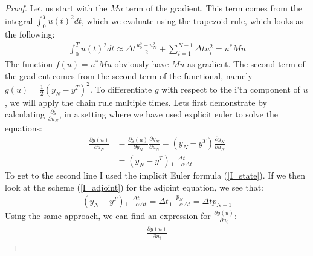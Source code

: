 \documentclass[11pt,a4paper]{article}
\begin{document}
\begin{proof}
Let us start with the $Mu$ term of the gradient. This term comes from the integral $\int_0^T u(t)^2dt$, which we evaluate using the trapezoid rule, which looks as the following:
\begin{align*}
\int_0^T u(t)^2dt \approx \Delta t\frac{u_0^2+u_N^2}{2} + \sum_{i=1}^{N-1} \Delta t u_i^2 = u^*Mu
\end{align*} 
The function $f(u)=u^*Mu$ obviously have $Mu$ as gradient. The second term of the gradient comes from the second term of the functional, namely $g(u)=\frac{1}{2}(y_N -y^T)^2$. To differentiate $g$ with respect to the i'th component of $u$, we will apply the chain rule multiple times. Lets first demonstrate by calculating $\frac{\partial g}{\partial u_N}$, in a setting where we have used explicit euler to solve the equations:
\begin{align*}
\frac{\partial g(u)}{\partial u_N} &= \frac{\partial g(u)}{\partial y_N}\frac{\partial y_N}{\partial u_N} = (y_N -y^T)\frac{\partial y_N}{\partial u_N}\\
&= (y_N -y^T)\frac{\Delta t}{1-\alpha\Delta t}
\end{align*}
To get to the second line I used the implicit Euler formula (\ref{I_state}). If we then look at the scheme (\ref{I_adjoint}) for the adjoint equation, we see that:
\begin{align*}
(y_N -y^T)\frac{\Delta t}{1-\alpha\Delta t} = \Delta t\frac{p_N}{1-\alpha\Delta t} = \Delta t p_{N-1}
\end{align*} 
Using the same approach, we can find an expression for $\frac{\partial g(u)}{\partial u_i}$: 
\begin{align*}
\frac{\partial g(u)}{\partial u_i}
\end{align*}
\end{proof}
\end{document}
